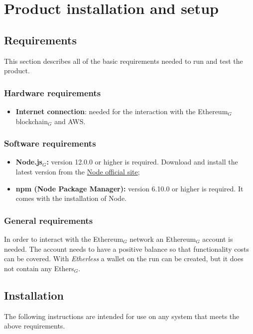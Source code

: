 \section{Product installation and setup}
  \subsection{Requirements}
    This section describes all of the basic requirements needed to run and test the product.
    \subsubsection{Hardware requirements}
      \begin{itemize}
      	\item \textbf{Internet connection}: needed for the interaction with the Ethereum$_{G}$ blockchain$_{G}$ and AWS.
      \end{itemize}
    \subsubsection{Software requirements}
      \begin{itemize}
        \item \textbf{Node.js$_{G}$:} version 12.0.0 or higher is required. Download and install the latest version from the \href{https://nodejs.org/it/download/}{Node official site};
        \item \textbf{npm (Node Package Manager):} version 6.10.0 or higher is required. It comes with the installation of Node.
      \end{itemize}
    \subsubsection{General requirements}
      In order to interact with the Ethereum$_{G}$ network an Ethereum$_{G}$ account is needed. The account needs to have a positive balance so that functionality costs can be covered. With \textit{Etherless} a wallet on the run can be created, but it does not contain any Ethers$_{G}$.
  \subsection{Installation}
    The following instructions are intended for use on any system that meets the above requirements.
    

